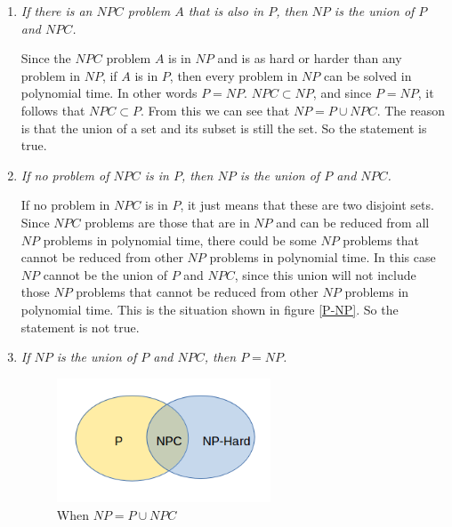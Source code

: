 \documentclass[paper=a4, fontsize=11pt]{scrartcl} %
\numberwithin{equation}{section} %
\numberwithin{figure}{section} %
\numberwithin{table}{section} %
\begin{document}
\begin{enumerate}
\begin{enumerate}
    If $P=NP$ and since $NPC \subset NP$, in this case $NP = P \cup NPC$. But it is unlikely that $P=NP$. Since $NPC$ problems are the hardest $NP$ problems, the relation $NP = P \cup NPC$ can only be satisfied if $NP - P = NPC$ (as in figure \ref{PuNPC}). i.e. if each $NP$ problem that cannot be solved in polynomial time can be reduced to any other $NP$ problem in polynomial time. This seems unlikely as it would mean that the $NP$ problems that cannot be solved in polynomial time are all NP complete. So the statement is not true.
    
    \item \textit{If there is an $NPC$ problem $A$ that is also in $P$, then $NP$ is the union of $P$ and $NPC$.}
    
Since the $NPC$ problem $A$ is in $NP$ and is as hard or harder than any problem in $NP$, if $A$ is in $P$, then every problem in $NP$ can be solved in polynomial time. In other words $P=NP$. $NPC \subset NP$, and since $P=NP$, it follows that $NPC \subset P$. From this we can see that $NP = P \cup NPC$. The reason is that the union of a set and its subset is still the set. So the statement is true.
    
    \item \textit{If no problem of $NPC$ is in $P$, then $NP$ is the union of $P$ and $NPC$.}
    
If no problem in $NPC$ is in $P$, it just means that these are two disjoint sets. Since $NPC$ problems are those that are in $NP$ and can be reduced from all $NP$ problems in polynomial time, there could be some $NP$ problems that cannot be reduced from other $NP$ problems in polynomial time. In this case $NP$ cannot be the union of $P$ and $NPC$, since this union will not include those $NP$ problems that cannot be reduced from other $NP$ problems in polynomial time. This is the situation shown in figure \ref{P-NP}. So the statement is not true.
    
    \item \textit{If $NP$ is the union of $P$ and $NPC$, then $P=NP$.}
    
	\begin{figure}[!h]
		\centering
		\includegraphics[width=2.5in]{PuNPC.png}
		\caption{When $NP=P \cup NPC$}
		\label{PuNPC}
	\end{figure}     
    

\end{enumerate}
\end{enumerate}
\end{document}
